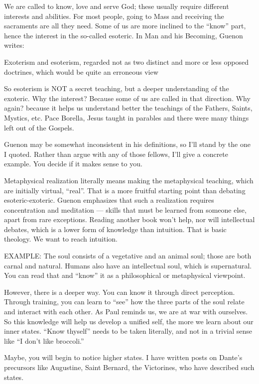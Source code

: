 \begin{footnotesize}
\begin{sffamily}
We are called to know, love and serve God; these usually require different interests and abilities. For most people, going to Mass and receiving the sacraments are all they need. Some of us are more inclined to the ``know'' part, hence the interest in the so-called esoteric. In Man and his Becoming, Guenon writes:

\begin{quotex}
Exoterism and esoterism, regarded not as two distinct and more or less opposed doctrines, which would be quite an erroneous view
\end{quotex}

So esoterism is NOT a secret teaching, but a deeper understanding of the exoteric. Why the interest? Because some of us are called in that direction. Why again? because it helps us understand better the teachings of the Fathers, Saints, Mystics, etc. Pace Borella, Jesus taught in parables and there were many things left out of the Gospels.

Guenon may be somewhat inconsistent in his definitions, so I'll stand by the one I quoted. Rather than argue with any of those fellows, I'll give a concrete example. You decide if it makes sense to you.

Metaphysical realization literally means making the metaphysical teaching, which are initially virtual, ``real''. That is a more fruitful starting point than debating esoteric-exoteric. Guenon emphasizes that such a realization requires concentration and meditation --- skills that must be learned from someone else, apart from rare exceptions. Reading another book won't help, nor will intellectual debates, which is a lower form of knowledge than intuition. That is basic theology. We want to reach intuition.

EXAMPLE: The soul consists of a vegetative and an animal soul; those are both carnal and natural. Humans also have an intellectual soul, which is supernatural. You can read that and ``know'' it as a philosophical or metaphysical viewpoint.

However, there is a deeper way. You can know it through direct perception. Through training, you can learn to ``see'' how the three parts of the soul relate and interact with each other. As Paul reminds us, we are at war with ourselves. So this knowledge will help us develop a unified self, the more we learn about our inner states. ``Know thyself'' needs to be taken literally, and not in a trivial sense like ``I don't like broccoli.''

Maybe, you will begin to notice higher states. I have written posts on Dante's precursors like Augustine, Saint Bernard, the Victorines, who have described such states.


\end{sffamily}
\end{footnotesize}
